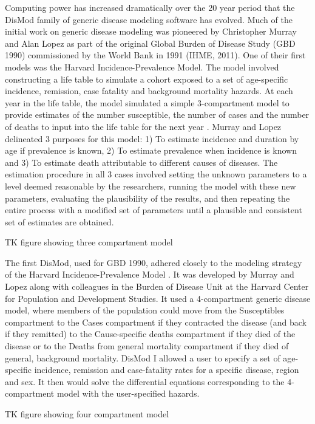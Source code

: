 Computing power has increased dramatically over the 20 year period
that the DisMod family of generic disease modeling software has
evolved. Much of the initial work on generic disease modeling was
pioneered by Christopher Murray and Alan Lopez as part of the original
Global Burden of Disease Study (GBD 1990) commissioned by the World
Bank in 1991 (IHME, 2011). One of their first models was the Harvard
Incidence-Prevalence Model. The model involved constructing a life
table to simulate a cohort exposed to a set of age-specific incidence,
remission, case fatality and background mortality hazards. At each
year in the life table, the model simulated a simple 3-compartment
model to provide estimates of the number susceptible, the number of
cases and the number of deaths to input into the life table for the
next year \cite{Murray_Quantifying_1994}. Murray and Lopez delineated
3 purposes for this model: 1) To estimate incidence and duration by
age if prevalence is known, 2) To estimate prevalence when incidence
is known and 3) To estimate death attributable to different causes of
diseases. The estimation procedure in all 3 cases involved setting the
unknown parameters to a level deemed reasonable by the researchers,
running the model with these new parameters, evaluating the
plausibility of the results, and then repeating the entire process
with a modified set of parameters until a plausible and consistent set
of estimates are obtained.

TK figure showing three compartment model

The first DisMod, used for GBD 1990, adhered closely to the modeling
strategy of the Harvard Incidence-Prevalence Model
\cite{Harvard_Global_1996}. It was developed by Murray and Lopez along
with colleagues in the Burden of Disease Unit at the Harvard Center
for Population and Development Studies. It used a 4-compartment
generic disease model, where members of the population could move from
the Susceptibles compartment to the Cases compartment if they
contracted the disease (and back if they remitted) to the
Cause-specific deaths compartment if they died of the disease or to
the Deaths from general mortality compartment if they died of general,
background mortality. DisMod I allowed a user to specify a set of
age-specific incidence, remission and case-fatality rates for a
specific disease, region and sex. It then would solve the differential
equations corresponding to the 4-compartment model with the
user-specified hazards.

TK figure showing four compartment model


